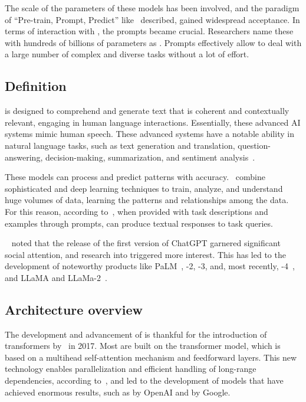 The scale of the parameters of these models has been involved, and the paradigm of ``Pre-train, Prompt, Predict'' like~\citet{liu_prompting_nodate} described, gained widespread acceptance. In terms of interaction with {\lm}, the prompts became crucial. Researchers name these {\plm} with hundreds of billions of parameters as {\llm}. Prompts effectively allow {\llm} to deal with a large number of complex and diverse tasks without a lot of effort.


\subsection{Definition}

{\llm} is designed to comprehend and generate text that is coherent and contextually relevant, engaging in human language interactions. Essentially, these advanced AI systems mimic human speech. These advanced {\ai} systems  have a notable ability in natural language tasks, such as text generation and translation, question-answering, decision-making, summarization, and sentiment analysis~\cite{zhao_survey_2023}.

These models can process and predict patterns with accuracy.~\citet{hadi_LLM_2023} combine sophisticated {\slm} and deep learning techniques to train, analyze, and understand huge volumes of data, learning the patterns and relationships among the data. For this reason, according to~\citet{naveed_comprehensive_2023}, when provided with task descriptions and examples through prompts, {\llm} can produce textual responses to task queries. 

~\citet{liu_prompting_nodate} noted that the release of the first version of ChatGPT garnered significant social attention, and research into {\llm} triggered more interest. This has led to the development of noteworthy products like PaLM~\cite{anil_palm_2023}, {\gpt}-2, {\gpt}-3, and, most recently, {\gpt}-4~\cite{openai_gpt-4_2023}, and LLaMA and LLaMa-2~\cite{touvron_llama_2023}.


\subsection{Architecture overview}

The development and advancement of {\llm} is thankful for the introduction of transformers by~\citet{vaswani_attention_2023} in 2017. Most {\llm} are built on the transformer model, which is based on a multihead self-attention mechanism and feedforward layers. This new technology enables parallelization and efficient handling of long-range dependencies, according to~\citet{hadi_LLM_2023}, and led to the development of models that have achieved enormous results, such as {\gpt} by OpenAI and {\bert} by Google. 


